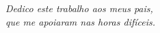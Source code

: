 
\vspace*{\fill}
\centering
\noindent
\textit{ Dedico este trabalho aos meus pais,\\
	que me apoiaram nas horas difíceis.}
\vspace*{\fill}

